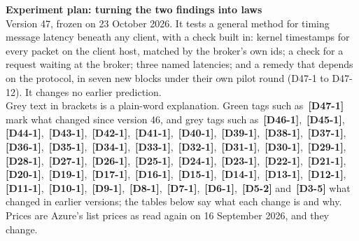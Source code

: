 \documentclass[11pt]{article}
\newcommand{\chg}[1]{\,{\color{chgcol}\bfseries\footnotesize[#1]}}
\newcommand{\chgold}[1]{\,{\color{oldcol}\bfseries\footnotesize[#1]}}
\begin{document}
{\LARGE\bfseries Experiment plan: turning the two findings into laws}\\[3pt]
{\large Version 47, frozen on 23 October 2026. It tests a general method for timing message latency beneath any client, with a check built in: kernel timestamps for every packet on the client host, matched by the broker's own ids; a check for a request waiting at the broker; three named latencies; and a remedy that depends on the protocol, in seven new blocks under their own pilot round (D47-1 to D47-12). It changes no earlier prediction.}\\[4pt]
{\color{soft}\small Grey text in brackets is a plain-word explanation. Green tags such as \chg{D47-1} mark what changed since version 46, and grey tags such as \chgold{D46-1}, \chgold{D45-1}, \chgold{D44-1}, \chgold{D43-1}, \chgold{D42-1}, \chgold{D41-1}, \chgold{D40-1}, \chgold{D39-1}, \chgold{D38-1}, \chgold{D37-1}, \chgold{D36-1}, \chgold{D35-1}, \chgold{D34-1}, \chgold{D33-1}, \chgold{D32-1}, \chgold{D31-1}, \chgold{D30-1}, \chgold{D29-1}, \chgold{D28-1}, \chgold{D27-1}, \chgold{D26-1}, \chgold{D25-1}, \chgold{D24-1}, \chgold{D23-1}, \chgold{D22-1}, \chgold{D21-1}, \chgold{D20-1}, \chgold{D19-1}, \chgold{D17-1}, \chgold{D16-1}, \chgold{D15-1}, \chgold{D14-1}, \chgold{D13-1}, \chgold{D12-1}, \chgold{D11-1}, \chgold{D10-1}, \chgold{D9-1}, \chgold{D8-1}, \chgold{D7-1}, \chgold{D6-1}, \chgold{D5-2} and \chgold{D3-5} what changed in earlier versions; the tables below say what each change is and why. Prices are Azure's list prices as read again on 16 September 2026, and they change.}
\end{document}
